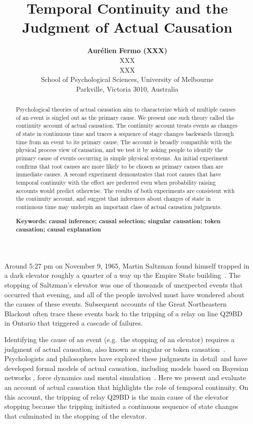 \documentclass[10pt,letterpaper]{article}
\title{Temporal Continuity and the Judgment of Actual Causation}
\author{{\large \bf Aur\'{e}lien Fermo (XXX)} \\
  XXX \\
  XXX 
  \AND {\large \bf Charles Kemp (c.kemp@unimelb.edu.au)} \\
  School of Psychological Sciences, University of Melbourne\\
  Parkville, Victoria 3010, Australia}
\begin{document}
\maketitle


\begin{abstract}

Psychological theories of actual causation aim to characterize which of multiple causes of an event is singled out as the primary cause. We present one such theory called the continuity account of actual causation. The continuity account treats events as changes of state in continuous time and traces a sequence of stage changes backwards through time from an event to its primary cause. The account is broadly compatible with the physical process view of causation, and we test it by asking people to identify the primary cause of events occurring in simple physical systems. An initial experiment confirms that root causes are more likely to be chosen as primary causes than are immediate causes. A second experiment demonstrates that root causes that have temporal continuity with the effect are preferred even when probability raising accounts would predict otherwise. The results of both experiments are consistent with the continuity account, and suggest that inferences about changes of state in continuous time may underpin an important class of actual causation judgments.  

\textbf{Keywords: causal inference; causal selection; singular causation; token causation; causal explanation} 
\end{abstract}


Around 5:27 pm on November 9, 1965, Martin Saltzman found himself trapped in a dark elevator roughly a quarter of a way up the Empire State building~\cite{gelbr1965night}. The stopping of Saltzman's elevator was one of thousands of unexpected events that occurred that evening, and all of the people involved must have wondered about the causes of these events. Subsequent accounts of the Great Northeastern Blackout often trace these events back to the tripping of a relay on line Q29BD in Ontario that triggered a cascade of failures.

Identifying the cause of an event (e.g.\ the stopping of an elevator) requires a judgment of actual causation, also known as singular or token causation~\cite{danks17}. Psychologists and philosophers have explored these judgments in detail~and have developed formal models of actual causation, including models based on Bayesian networks \cite{halpern16}, force dynamics \cite{wolfft17} and mental simulation~\cite{gerstenberg21}.  Here we present and evaluate an account of actual causation that highlights the role of temporal continuity.  On this account, the tripping of relay Q29BD is the main cause of the elevator stopping because the tripping initiated a continuous sequence of state changes that culminated in the stopping of the elevator.
\end{document}
